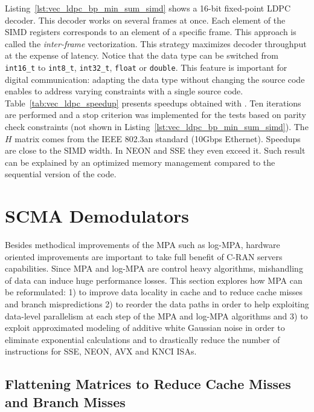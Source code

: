 Listing~\ref{lst:vec_ldpc_bp_min_sum_simd} shows a 16-bit fixed-point LDPC
decoder. This decoder works on several frames at once. Each element of the SIMD
registers corresponds to an element of a specific frame. This approach is called
the \textit{inter-frame} vectorization. This strategy maximizes decoder
throughput at the expense of latency. Notice that the data type can be switched
from \verb|int16_t| to \verb|int8_t|, \verb|int32_t|, \verb|float| or
\verb|double|. This \MIPP feature is important for digital communication:
adapting the data type without changing the source code enables to address
varying constraints with a single source code. Table~\ref{tab:vec_ldpc_speedup}
presents speedups obtained with \MIPP. Ten iterations are performed and a stop
criterion was implemented for the tests based on parity check constraints (not
shown in Listing~\ref{lst:vec_ldpc_bp_min_sum_simd}). The $H$ matrix comes from
the IEEE 802.3an standard (10Gbps Ethernet). Speedups are close to the SIMD
width. In NEON and SSE they even exceed it. Such result can be explained by an
optimized memory management compared to the sequential version of the code.

\section{SCMA Demodulators}
\label{sec:opt_scma}

Besides methodical improvements of the MPA such as log-MPA, hardware oriented
improvements are important to take full benefit of C-RAN servers capabilities.
Since MPA and log-MPA are control heavy algorithms, mishandling of data can
induce huge performance losses. This section explores how MPA can be
reformulated: 1) to improve data locality in cache and to reduce cache misses
and branch mispredictions 2) to reorder the data paths in order to help
exploiting data-level parallelism at each step of the MPA and log-MPA algorithms
and 3) to exploit approximated modeling of additive white Gaussian noise in
order to eliminate exponential calculations and to drastically reduce the number
of instructions for SSE, NEON, AVX and KNCI ISAs.

\subsection{Flattening Matrices to Reduce Cache Misses and Branch Misses}
\label{sec:opt_scma_flattening}

